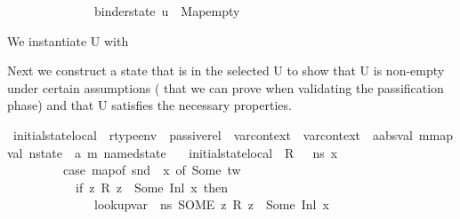 \begin{isabellebody}
\ \ \ \ \ \ \ \ \ \ \ \ \ \ binder{\isacharunderscore}{\kern0pt}state\ u\ {\isacharequal}{\kern0pt}\ Map{\isachardot}{\kern0pt}empty{\isacharbraceright}{\kern0pt}{\isachardoublequoteclose}%
\begin{isamarkuptext}%
We instantiate U with %
\end{isamarkuptext}\isamarkuptrue%
%
\begin{isamarkuptext}%
Next we construct a state that is in the selected U to show that U is non-empty under certain assumptions (
that we can prove when validating the passification phase) and that U satisfies the necessary properties.%
\end{isamarkuptext}\isamarkuptrue%
\isamarkupfalse%
\ initial{\isacharunderscore}{\kern0pt}state{\isacharunderscore}{\kern0pt}local\ {\isacharcolon}{\kern0pt}{\isacharcolon}{\kern0pt}\ {\isachardoublequoteopen}rtype{\isacharunderscore}{\kern0pt}env\ {\isasymRightarrow}\ passive{\isacharunderscore}{\kern0pt}rel\ {\isasymRightarrow}\ var{\isacharunderscore}{\kern0pt}context\ {\isasymRightarrow}\ var{\isacharunderscore}{\kern0pt}context\ {\isasymRightarrow}\ {\isacharparenleft}{\kern0pt}{\isacharprime}{\kern0pt}a{\isacharcolon}{\kern0pt}{\isacharcolon}{\kern0pt}absval{\isacharcomma}{\kern0pt}\ {\isacharprime}{\kern0pt}m{\isacharcolon}{\kern0pt}{\isacharcolon}{\kern0pt}mapval{\isacharparenright}{\kern0pt}\ nstate\ {\isasymRightarrow}\ {\isacharparenleft}{\kern0pt}{\isacharprime}{\kern0pt}a{\isacharcomma}{\kern0pt}\ {\isacharprime}{\kern0pt}m{\isacharparenright}{\kern0pt}\ named{\isacharunderscore}{\kern0pt}state{\isachardoublequoteclose}\isanewline
\ \ \ {\isachardoublequoteopen}initial{\isacharunderscore}{\kern0pt}state{\isacharunderscore}{\kern0pt}local\ {\isasymOmega}\ R\ {\isasymLambda}\ {\isasymLambda}{\isacharprime}{\kern0pt}\ ns\ x\ {\isacharequal}{\kern0pt}\ \isanewline
\ \ \ \ \ \ \ \ \ {\isacharparenleft}{\kern0pt}case\ {\isacharparenleft}{\kern0pt}map{\isacharunderscore}{\kern0pt}of\ {\isacharparenleft}{\kern0pt}snd\ {\isasymLambda}{\isacharprime}{\kern0pt}{\isacharparenright}{\kern0pt}\ x{\isacharparenright}{\kern0pt}\ of\ Some\ tw\ {\isacharequal}{\kern0pt}{\isachargreater}{\kern0pt}\isanewline
\ \ \ \ \ \ \ \ \ \ \ {\isacharparenleft}{\kern0pt}if\ {\isacharparenleft}{\kern0pt}{\isasymexists}z{\isachardot}{\kern0pt}\ R\ z\ {\isacharequal}{\kern0pt}\ Some\ {\isacharparenleft}{\kern0pt}Inl\ x{\isacharparenright}{\kern0pt}{\isacharparenright}{\kern0pt}\ then\ \isanewline
\ \ \ \ \ \ \ \ \ \ \ \ \ \ lookup{\isacharunderscore}{\kern0pt}var\ {\isasymLambda}\ ns\ {\isacharparenleft}{\kern0pt}SOME\ z{\isachardot}{\kern0pt}\ R\ z\ {\isacharequal}{\kern0pt}\ Some\ {\isacharparenleft}{\kern0pt}Inl\ x{\isacharparenright}{\kern0pt}{\isacharparenright}{\kern0pt}\ \isanewline

\end{isabellebody}
